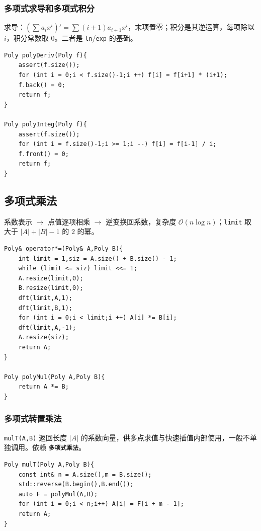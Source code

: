 \subsubsection{多项式求导和多项式积分}

求导：$(\sum a_ix^i)'=\sum (i+1)a_{i+1}x^i$，末项置零；积分是其逆运算，每项除以 $i$，积分常数取 $0$。二者是 \texttt{ln}/\texttt{exp} 的基础。

\begin{lstlisting}
Poly polyDeriv(Poly f){
    assert(f.size());
    for (int i = 0;i < f.size()-1;i ++) f[i] = f[i+1] * (i+1);
    f.back() = 0;
    return f;
}

Poly polyInteg(Poly f){
    assert(f.size());
    for (int i = f.size()-1;i >= 1;i --) f[i] = f[i-1] / i;
    f.front() = 0;
    return f;
}
\end{lstlisting}

\subsection{多项式乘法}

系数表示 $\to$ 点值逐项相乘 $\to$ 逆变换回系数，复杂度 $\mathcal{O}(n\log n)$；\texttt{limit} 取大于 $|A|+|B|-1$ 的 $2$ 的幂。

\begin{lstlisting}
Poly& operator*=(Poly& A,Poly B){
    int limit = 1,siz = A.size() + B.size() - 1;
    while (limit <= siz) limit <<= 1;
    A.resize(limit,0);
    B.resize(limit,0);
    dft(limit,A,1);
    dft(limit,B,1);
    for (int i = 0;i < limit;i ++) A[i] *= B[i];
    dft(limit,A,-1);
    A.resize(siz);
    return A;
}

Poly polyMul(Poly A,Poly B){
    return A *= B;
}
\end{lstlisting}

\subsubsection{多项式转置乘法}

\texttt{mulT(A,B)} 返回长度 $|A|$ 的系数向量，供多点求值与快速插值内部使用，一般不单独调用。依赖 \textbf{\texttt{多项式乘法}}。

\begin{lstlisting}
Poly mulT(Poly A,Poly B){
    const int& n = A.size(),m = B.size();
    std::reverse(B.begin(),B.end());
    auto F = polyMul(A,B);
    for (int i = 0;i < n;i++) A[i] = F[i + m - 1];
    return A;
}
\end{lstlisting}

